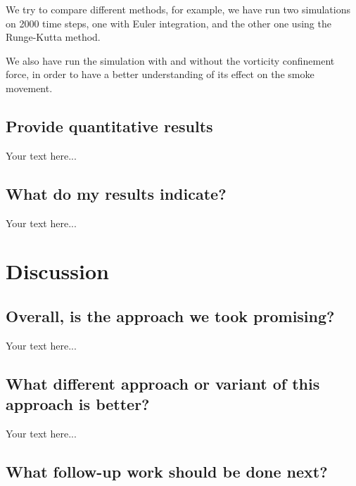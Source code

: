 \documentclass[accepted,single]{gipaper}
\begin{document}
We try to compare different methods, for example, we have run two simulations on 2000 time steps, one with Euler integration, and the other one using the Runge-Kutta method. 

We also have run the simulation with and without the vorticity confinement force, in order to have a better understanding of its effect on the smoke movement.

\subsection{Provide quantitative results}

Your text here...

\subsection{What do my results indicate?}

Your text here...


\section{Discussion}

\subsection{Overall, is the approach we took promising?}

Your text here...

\subsection{What different approach or variant of this approach is better?}

Your text here...

\subsection{What follow-up work should be done next?}
\end{document}

